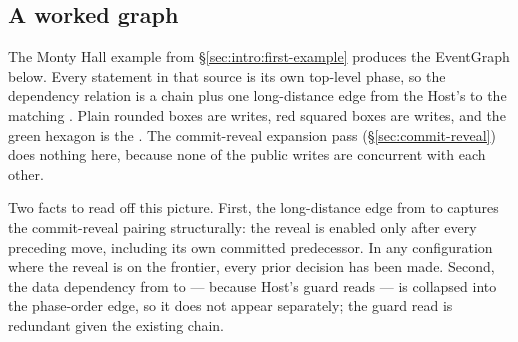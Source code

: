 \subsection{A worked graph}
\label{sec:eventgraph:example}

The Monty Hall example from \S\ref{sec:intro:first-example}
produces the EventGraph below.  Every statement in that source is
its own top-level phase, so the dependency relation is a chain
plus one long-distance edge from the Host's \COMMIT to the
matching \REVEAL.  Plain rounded boxes are \PUBLIC writes,
red squared boxes are \COMMIT writes, and the green hexagon is
the \REVEAL.  The commit-reveal expansion pass
(\S\ref{sec:commit-reveal}) does nothing here, because none of
the public writes are concurrent with each other.

\begin{center}
\end{center}

Two facts to read off this picture.  First, the long-distance
edge from  to  captures
the commit-reveal pairing structurally: the reveal is enabled
only after every preceding move, including its own committed
predecessor.  In any configuration where the reveal is on the
frontier, every prior decision has been made.  Second, the data
dependency from  to  ---
because Host's guard reads  --- is collapsed into
the phase-order edge, so it does not appear separately; the
guard read is redundant given the existing chain.

